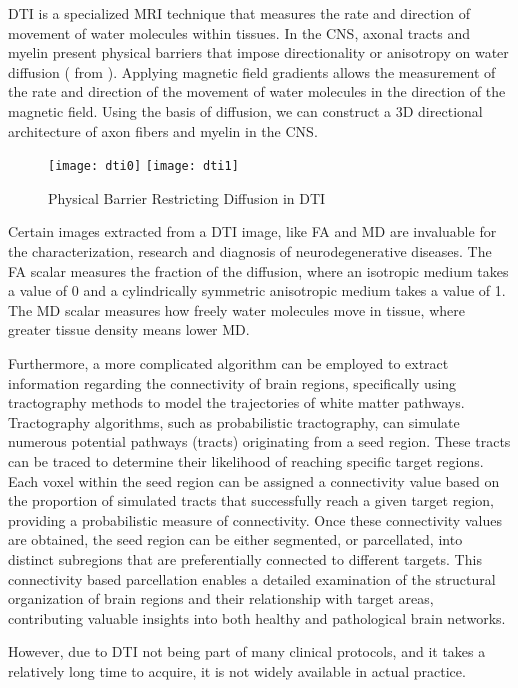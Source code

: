 \ac{DTI} is a specialized \ac{MRI} technique that measures the rate and direction of movement of water molecules within tissues. In the \ac{CNS}, axonal tracts and myelin present physical barriers that impose directionality or anisotropy on water diffusion ( from \cite{dti}). Applying magnetic field gradients allows the measurement of the rate and direction of the movement of water molecules in the direction of the magnetic field. Using the basis of diffusion, we can construct a 3D directional architecture of axon fibers and myelin in the \ac{CNS}. \cite{dti}
\begin{figure}[H]
\centering
\texttt{[image: dti0]}
\texttt{[image: dti1]}
\caption{Physical Barrier Restricting Diffusion in \acs{DTI}}
\label{fig:dti}
\end{figure}
Certain images extracted from a \ac{DTI} image, like \ac{FA} and \ac{MD} are invaluable for the characterization, research and diagnosis of neurodegenerative diseases. The \ac{FA} scalar measures the fraction of the diffusion, where an isotropic medium takes a value of 0 and a cylindrically symmetric anisotropic medium takes a value of 1. The \ac{MD} scalar measures how freely water molecules move in tissue, where greater tissue density means lower \ac{MD}. \cite{rd}\par
Furthermore, a more complicated algorithm can be employed to extract information regarding the connectivity of brain regions, specifically using tractography methods to model the trajectories of white matter pathways. Tractography algorithms, such as probabilistic tractography, can simulate numerous potential pathways (tracts) originating from a seed region. These tracts can be traced to determine their likelihood of reaching specific target regions. Each voxel within the seed region can be assigned a connectivity value based on the proportion of simulated tracts that successfully reach a given target region, providing a probabilistic measure of connectivity. Once these connectivity values are obtained, the seed region can be either segmented, or parcellated, into distinct subregions that are preferentially connected to different targets. This connectivity based parcellation enables a detailed examination of the structural organization of brain regions and their relationship with target areas, contributing valuable insights into both healthy and pathological brain networks. \cite{tract} \cite{tract2}\par
However, due to \ac{DTI} not being part of many clinical protocols, and it takes a relatively long time to acquire, it is not widely available in actual practice.

